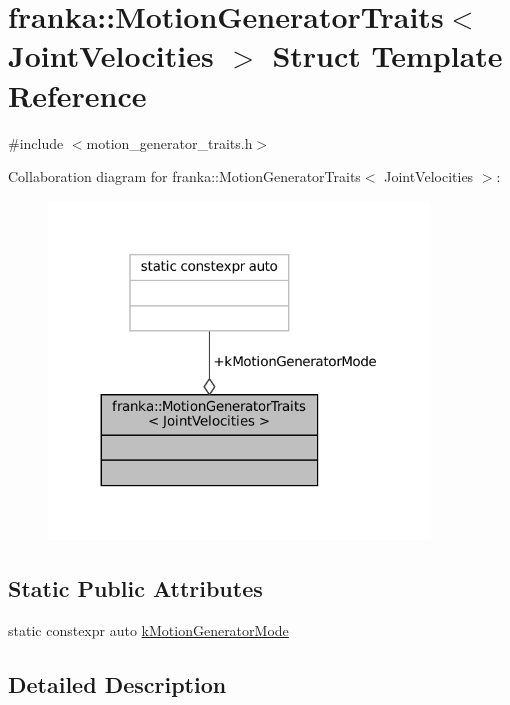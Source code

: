 \hypertarget{structfranka_1_1MotionGeneratorTraits_3_01JointVelocities_01_4}{}\section{franka\+:\+:Motion\+Generator\+Traits$<$ Joint\+Velocities $>$ Struct Template Reference}
\label{structfranka_1_1MotionGeneratorTraits_3_01JointVelocities_01_4}


{\ttfamily \#include $<$motion\+\_\+generator\+\_\+traits.\+h$>$}



Collaboration diagram for franka\+:\+:Motion\+Generator\+Traits$<$ Joint\+Velocities $>$\+:
\nopagebreak
\begin{figure}[H]
\begin{center}
\leavevmode
\includegraphics[width=287pt]{structfranka_1_1MotionGeneratorTraits_3_01JointVelocities_01_4__coll__graph}
\end{center}
\end{figure}
\subsection*{Static Public Attributes}
\begin{DoxyCompactItemize}
\item 
static constexpr auto \hyperlink{structfranka_1_1MotionGeneratorTraits_3_01JointVelocities_01_4_ada18869e23e04d6655a93c811b99679f}{k\+Motion\+Generator\+Mode}
\end{DoxyCompactItemize}


\subsection{Detailed Description}
